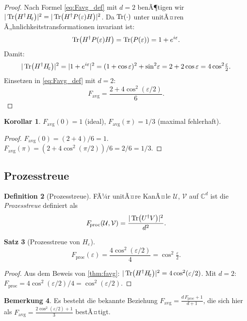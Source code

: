 ﻿\documentclass[11pt,a4paper]{article}
\theoremstyle{definition}
\newtheorem{theorem}{Satz}[section]
\newtheorem{corollary}[theorem]{Korollar}
\newtheorem{definition}[theorem]{Definition}
\newtheorem{remark}[theorem]{Bemerkung}
\newcommand{\eps}{\varepsilon}
\newcommand{\Heps}{H_{\!\varepsilon}}
\newcommand{\Fav}{F_{\!\mathrm{avg}}}
\newcommand{\C}{\mathbb{C}}
\begin{document}
\begin{proof}
  Nach Formel \eqref{eq:Favg_def} mit $d=2$ benÃ¶tigen wir
  $|\Tr(H^\dagger \Heps)|^2 = |\Tr(H^\dagger P(\eps) H)|^2$.
  Da $\Tr(\cdot)$ unter unitÃ¤ren Ã„hnlichkeitstransformationen invariant ist:
  \[
    \Tr(H^\dagger P(\eps) H) = \Tr(P(\eps)) = 1 + e^{i\eps}.
  \]
  Damit:
  \[
    |\Tr(H^\dagger\Heps)|^2 = |1 + e^{i\eps}|^2 = (1+\cos\eps)^2 + \sin^2\!\eps
    = 2 + 2\cos\eps = 4\cos^2\!\tfrac{\eps}{2}.
  \]
  Einsetzen in \eqref{eq:Favg_def} mit $d=2$:
  \[
    \Fav = \frac{2 + 4\cos^2(\eps/2)}{6}.
  \]
\end{proof}

\begin{corollary}
  $\Fav(0) = 1$ (ideal), $\Fav(\pi) = 1/3$ (maximal fehlerhaft).
\end{corollary}

\begin{proof}
  $\Fav(0) = (2+4)/6 = 1$. $\Fav(\pi) = (2 + 4\cos^2(\pi/2))/6 = 2/6 = 1/3$.
\end{proof}

\subsection{Prozesstreue}
\label{subsec:proc_fidelity}

\begin{definition}[Prozesstreue]
  FÃ¼r unitÃ¤re KanÃ¤le $\mathcal{U}$, $\mathcal{V}$ auf $\C^d$ ist die
  \emph{Prozesstreue} definiert als
  \begin{equation}
    F_{\!\mathrm{proc}}(\mathcal{U},\mathcal{V})
    = \frac{|\Tr(U^\dagger V)|^2}{d^2}.
    \label{eq:Fproc_def}
  \end{equation}
\end{definition}

\begin{theorem}[Prozesstreue von $\Heps$]
\label{thm:fproc}
  \begin{equation}
    F_{\!\mathrm{proc}}(\eps) = \frac{4\cos^2(\eps/2)}{4} = \cos^2\!\tfrac{\eps}{2}.
    \label{eq:Fproc_result}
  \end{equation}
\end{theorem}

\begin{proof}
  Aus dem Beweis von \cref{thm:favg}: $|\Tr(H^\dagger\Heps)|^2 = 4\cos^2(\eps/2)$.
  Mit $d=2$: $F_{\mathrm{proc}} = 4\cos^2(\eps/2)/4 = \cos^2(\eps/2)$.
\end{proof}

\begin{remark}
  Es besteht die bekannte Beziehung
  $\Fav = \frac{d\,F_{\mathrm{proc}} + 1}{d+1}$, die sich hier
  als $\Fav = \frac{2\cos^2(\eps/2)+1}{3}$ bestÃ¤tigt.
\end{remark}
\end{document}
